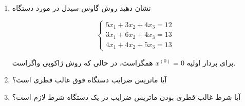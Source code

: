 \begin{enumerate}
    \item نشان دهید روش گاوس-سیدل 
    در مورد دستگاه
\begin{center}
\[
    \begin{cases}
    5x_1 + 3x_2 + 4x_3 = 12 \\
    3x_1 + 6x_2 + 4x_3 = 13 \\
    4x_1 + 4x_2 + 5x_3 = 13
    \end{cases}
\]
\end{center}
برای بردار اولیه 
$x^{(0)} = 0$
همگراست، در حالی که روش ژاکوبی واگراست.
\item 
آیا ماتریس ضرایب دستگاه فوق غالب قطری است؟
\item 
آیا شرط غالب قطری بودن ماتریس ضرایب در یک دستگاه شرط لازم است؟
\end{enumerate}


